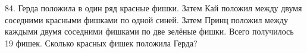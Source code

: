 84. Герда положила в один ряд красные фишки. Затем Кай положил между двумя соседними красными фишками по одной синей. Затем Принц положил между каждыми двумя соседними фишками по две зелёные фишки. Всего получилось 19 фишек. Сколько красных фишек положила Герда?\\
